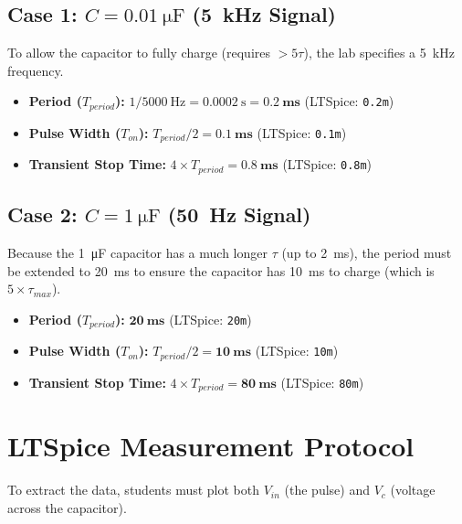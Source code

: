 \documentclass[11pt]{article}
\begin{document}
\subsection*{Case 1: $C = \SI{0.01}{\micro\farad}$ (\SI{5}{\kilo\hertz} Signal)}
To allow the capacitor to fully charge (requires $>5\tau$), the lab specifies a \SI{5}{\kilo\hertz} frequency.
\begin{itemize}
  \item \textbf{Period ($T_{period}$):} $1 / \SI{5000}{\hertz} = \SI{0.0002}{\second} = \mathbf{\SI{0.2}{\milli\second}}$ (LTSpice: \texttt{0.2m})
  \item \textbf{Pulse Width ($T_{on}$):} $T_{period} / 2 = \mathbf{\SI{0.1}{\milli\second}}$ (LTSpice: \texttt{0.1m})
  \item \textbf{Transient Stop Time:} $4 \times T_{period} = \mathbf{\SI{0.8}{\milli\second}}$ (LTSpice: \texttt{0.8m})
\end{itemize}

\subsection*{Case 2: $C = \SI{1}{\micro\farad}$ (\SI{50}{\hertz} Signal)}
Because the \SI{1}{\micro\farad} capacitor has a much longer $\tau$ (up to \SI{2}{\milli\second}), the period must be extended to \SI{20}{\milli\second} to ensure the capacitor has \SI{10}{\milli\second} to charge (which is $5 \times \tau_{max}$).
\begin{itemize}
  \item \textbf{Period ($T_{period}$):} $\mathbf{\SI{20}{\milli\second}}$ (LTSpice: \texttt{20m})
  \item \textbf{Pulse Width ($T_{on}$):} $T_{period} / 2 = \mathbf{\SI{10}{\milli\second}}$ (LTSpice: \texttt{10m})
  \item \textbf{Transient Stop Time:} $4 \times T_{period} = \mathbf{\SI{80}{\milli\second}}$ (LTSpice: \texttt{80m})
\end{itemize}

\vspace{0.2in}
\section*{LTSpice Measurement Protocol}

To extract the data, students must plot both $V_{in}$ (the pulse) and $V_c$ (voltage across the capacitor).
\end{document}
